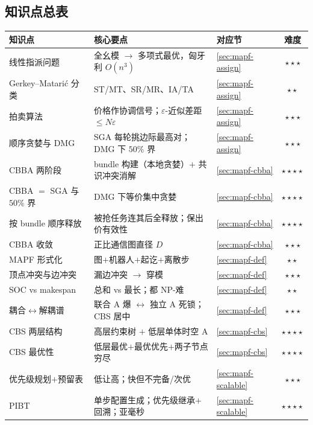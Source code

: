 \subsection*{知识点总表}
\begin{table}[H]\centering\small
\begin{tabular}{lllc}
\toprule
知识点 & 核心要点 & 对应节 & 难度 \\
\midrule
线性指派问题 & 全幺模 $\to$ 多项式最优，匈牙利 $O(n^3)$ & \cref{sec:mapf-assign} & $\star\star\star$ \\
Gerkey--Matari\'c 分类 & ST/MT、SR/MR、IA/TA & \cref{sec:mapf-assign} & $\star\star$ \\
拍卖算法 & 价格作协调信号；$\varepsilon$-近似差距 $\le N\varepsilon$ & \cref{sec:mapf-assign} & $\star\star\star$ \\
顺序贪婪与 DMG & SGA 每轮挑边际最高对；DMG 下 $50\%$ 界 & \cref{sec:mapf-assign} & $\star\star\star$ \\
CBBA 两阶段 & bundle 构建（本地贪婪）$+$ 共识冲突消解 & \cref{sec:mapf-cbba} & $\star\star\star\star$ \\
CBBA $=$ SGA 与 $50\%$ 界 & DMG 下等价集中贪婪 & \cref{sec:mapf-cbba} & $\star\star\star\star$ \\
按 bundle 顺序释放 & 被抢任务连其后全释放；保出价有效性 & \cref{sec:mapf-cbba} & $\star\star\star\star$ \\
CBBA 收敛 & 正比通信图直径 $D$ & \cref{sec:mapf-cbba} & $\star\star\star$ \\
MAPF 形式化 & 图$+$机器人$+$起讫$+$离散步 & \cref{sec:mapf-def} & $\star\star$ \\
顶点冲突与边冲突 & 漏边冲突 $\to$ 穿模 & \cref{sec:mapf-def} & $\star\star\star$ \\
SOC vs makespan & 总和 vs 最长；都 NP-难 & \cref{sec:mapf-def} & $\star\star$ \\
耦合$\leftrightarrow$解耦谱 & 联合 A\* 爆 $\leftrightarrow$ 独立 A\* 死锁；CBS 居中 & \cref{sec:mapf-def} & $\star\star\star$ \\
CBS 两层结构 & 高层约束树 $+$ 低层单体时空 A\* & \cref{sec:mapf-cbs} & $\star\star\star\star$ \\
CBS 最优性 & 低层最优$+$最优优先$+$两子节点穷尽 & \cref{sec:mapf-cbs} & $\star\star\star\star$ \\
优先级规划$+$预留表 & 低让高；快但不完备/次优 & \cref{sec:mapf-scalable} & $\star\star\star$ \\
PIBT & 单步配置生成；优先级继承$+$回溯；亚毫秒 & \cref{sec:mapf-scalable} & $\star\star\star\star$ \\

\end{tabular}
\end{table}
